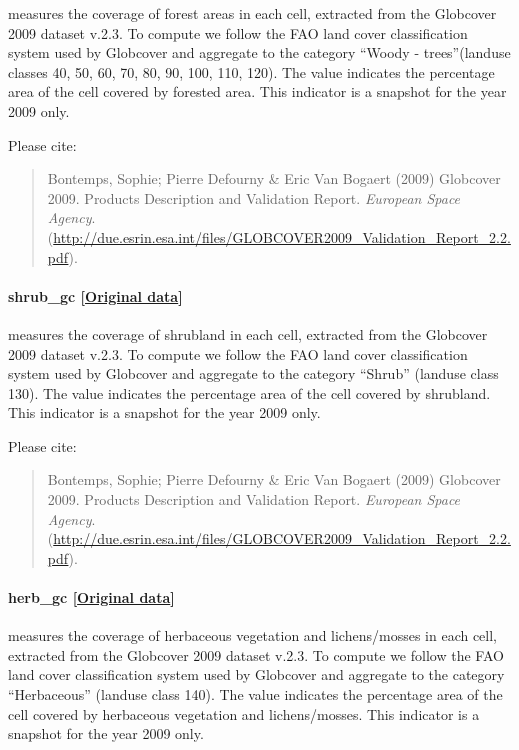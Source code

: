 \documentclass[]{book}
\begin{document}
measures the coverage of forest areas in each cell, extracted from the
Globcover 2009 dataset v.2.3. To compute  we follow
the FAO land cover classification system used by Globcover and aggregate
to the category ``Woody - trees''(landuse classes 40, 50, 60, 70, 80,
90, 100, 110, 120). The value indicates the percentage area of the cell
covered by forested area. This indicator is a snapshot for the year 2009
only.

Please cite:

\begin{quote}
Bontemps, Sophie; Pierre Defourny \& Eric Van Bogaert (2009) Globcover
2009. Products Description and Validation Report. \emph{European Space
Agency}.
(\url{http://due.esrin.esa.int/files/GLOBCOVER2009_Validation_Report_2.2.pdf}).
\end{quote}

\paragraph{shrub\_gc
{[}\href{http://due.esrin.esa.int/page_globcover.php}{Original
data}{]}}\label{shrub-gc}

measures the coverage of shrubland in each cell, extracted from the
Globcover 2009 dataset v.2.3. To compute  we follow
the FAO land cover classification system used by Globcover and aggregate
to the category ``Shrub'' (landuse class 130). The value indicates the
percentage area of the cell covered by shrubland. This indicator is a
snapshot for the year 2009 only.

Please cite:

\begin{quote}
Bontemps, Sophie; Pierre Defourny \& Eric Van Bogaert (2009) Globcover
2009. Products Description and Validation Report. \emph{European Space
Agency}.
(\url{http://due.esrin.esa.int/files/GLOBCOVER2009_Validation_Report_2.2.pdf}).
\end{quote}

\paragraph{herb\_gc
{[}\href{http://due.esrin.esa.int/page_globcover.php}{Original
data}{]}}\label{herb-gc}

measures the coverage of herbaceous vegetation and lichens/mosses in
each cell, extracted from the Globcover 2009 dataset v.2.3. To compute
 we follow the FAO land cover classification system
used by Globcover and aggregate to the category ``Herbaceous'' (landuse
class 140). The value indicates the percentage area of the cell covered
by herbaceous vegetation and lichens/mosses. This indicator is a snapshot for the year 2009 only.
\end{document}

